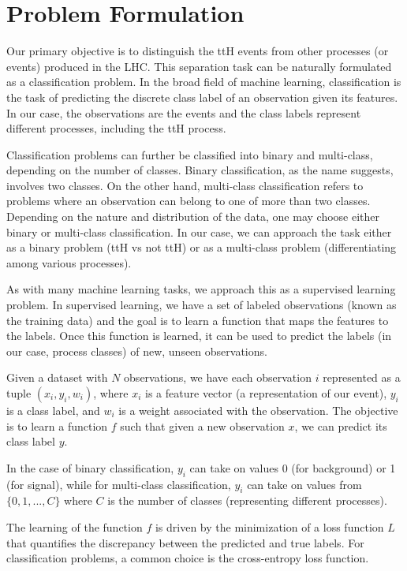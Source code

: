 \section{Problem Formulation}

Our primary objective is to distinguish the ttH events from other processes (or events) produced in the LHC. This
separation task can be naturally formulated as a classification problem. In the broad field of machine learning,
classification is the task of predicting the discrete class label of an observation given its features. In our case, the
observations are the events and the class labels represent different processes, including the ttH process.

Classification problems can further be classified into binary and multi-class, depending on the number of classes.
Binary classification, as the name suggests, involves two classes. On the other hand, multi-class classification refers
to problems where an observation can belong to one of more than two classes. Depending on the nature and distribution of
the data, one may choose either binary or multi-class classification. In our case, we can approach the task either as a
binary problem (ttH vs not ttH) or as a multi-class problem (differentiating among various processes).

As with many machine learning tasks, we approach this as a supervised learning problem. In supervised learning, we have
a set of labeled observations (known as the training data) and the goal is to learn a function that maps the features to
the labels. Once this function is learned, it can be used to predict the labels (in our case, process classes) of new,
unseen observations.

Given a dataset with $N$ observations, we have each observation $i$ represented as a tuple $(x_i, y_i, w_i)$, where
$x_i$ is a feature vector (a representation of our event), $y_i$ is a class label, and $w_i$ is a weight associated with
the observation. The objective is to learn a function $f$ such that given a new observation $x$, we can predict its
class label $y$.

In the case of binary classification, $y_i$ can take on values 0 (for background) or 1 (for signal), while for
multi-class classification, $y_i$ can take on values from $\{0, 1, ..., C\}$ where $C$ is the number of classes
(representing different processes).

The learning of the function $f$ is driven by the minimization of a loss function $L$ that quantifies the discrepancy
between the predicted and true labels. For classification problems, a common choice is the cross-entropy loss function.


